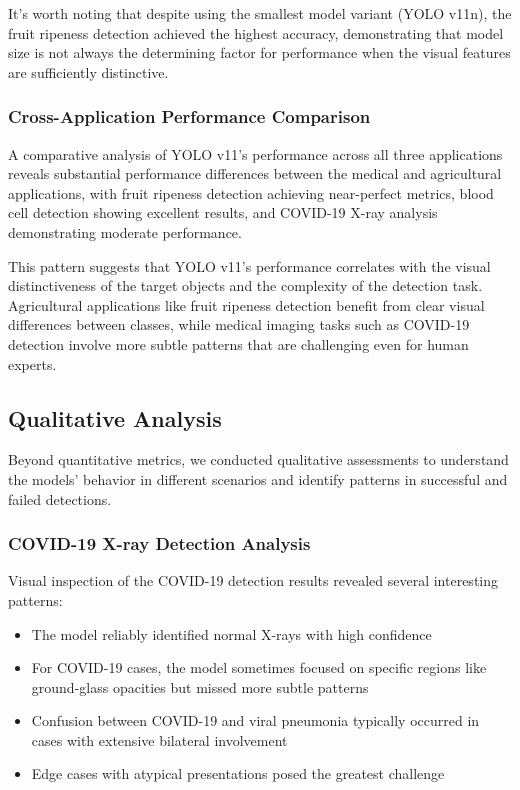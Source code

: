 \begin{multicols}{2}
It's worth noting that despite using the smallest model variant (YOLO v11n), the fruit ripeness detection achieved the highest accuracy, demonstrating that model size is not always the determining factor for performance when the visual features are sufficiently distinctive.

\subsubsection{Cross-Application Performance Comparison}

A comparative analysis of YOLO v11's performance across all three applications reveals substantial performance differences between the medical and agricultural applications, with fruit ripeness detection achieving near-perfect metrics, blood cell detection showing excellent results, and COVID-19 X-ray analysis demonstrating moderate performance.

This pattern suggests that YOLO v11's performance correlates with the visual distinctiveness of the target objects and the complexity of the detection task. Agricultural applications like fruit ripeness detection benefit from clear visual differences between classes, while medical imaging tasks such as COVID-19 detection involve more subtle patterns that are challenging even for human experts.

\subsection{Qualitative Analysis}

Beyond quantitative metrics, we conducted qualitative assessments to understand the models' behavior in different scenarios and identify patterns in successful and failed detections.

\subsubsection{COVID-19 X-ray Detection Analysis}

Visual inspection of the COVID-19 detection results revealed several interesting patterns:

\begin{itemize}
    \item The model reliably identified normal X-rays with high confidence
    \item For COVID-19 cases, the model sometimes focused on specific regions like ground-glass opacities but missed more subtle patterns
    \item Confusion between COVID-19 and viral pneumonia typically occurred in cases with extensive bilateral involvement
    \item Edge cases with atypical presentations posed the greatest challenge
\end{itemize}


\end{multicols}
